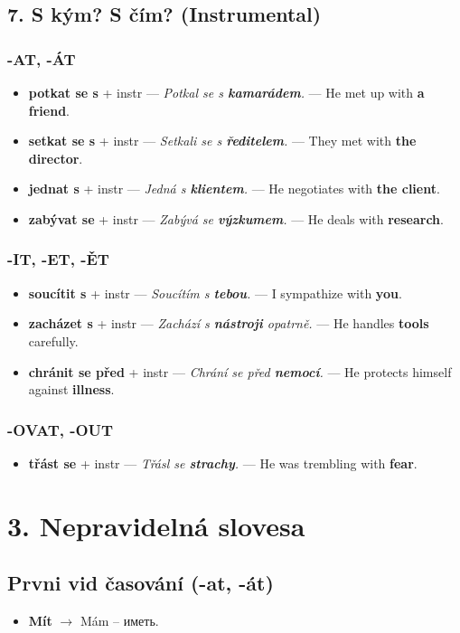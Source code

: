 \documentclass[12pt]{book}
\newcommand{\words}[2]{
    \renewcommand\chaptername{}
    \renewcommand\thechapter{}
    \chapter{#1. #2}
    \renewcommand\thechapter{#1}
}
\begin{document}
\section{7. S kým? S čím? (Instrumental)}
\subsection*{-AT, -ÁT}
\begin{itemize}
    \item \textbf{potkat se s} + instr --- \textit{Potkal se s \textbf{kamarádem}.} --- He met up with \textbf{a friend}.
    \item \textbf{setkat se s} + instr --- \textit{Setkali se s \textbf{ředitelem}.} --- They met with \textbf{the director}.
    \item \textbf{jednat s} + instr --- \textit{Jedná s \textbf{klientem}.} --- He negotiates with \textbf{the client}.
    \item \textbf{zabývat se} + instr --- \textit{Zabývá se \textbf{výzkumem}.} --- He deals with \textbf{research}.
\end{itemize}

\subsection*{-IT, -ET, -ĚT}
\begin{itemize}
    \item \textbf{soucítit s} + instr --- \textit{Soucítím s \textbf{tebou}.} --- I sympathize with \textbf{you}.
    \item \textbf{zacházet s} + instr --- \textit{Zachází s \textbf{nástroji} opatrně.} --- He handles \textbf{tools} carefully.
    \item \textbf{chránit se před} + instr --- \textit{Chrání se před \textbf{nemocí}.} --- He protects himself against \textbf{illness}.
\end{itemize}

\subsection*{-OVAT, -OUT}
\begin{itemize}
    \item \textbf{třást se} + instr --- \textit{Třásl se \textbf{strachy}.} --- He was trembling with \textbf{fear}.
\end{itemize}


\words{3}{Nepravidelná slovesa}
\section{Prvni vid časování (-at, -át)}
\begin{itemize}
    \item \textbf{Mít} $\rightarrow$ Mám -- \textrussian{иметь}.
\end{itemize}
\end{document}
